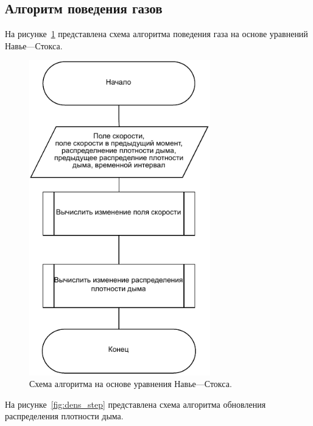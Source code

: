 \subsection{Алгоритм поведения газов}

На рисунке~\ref{fig:Navie-Stocks} представлена схема алгоритма поведения газа на основе уравнений Навье---Стокса. 
\begin{figure}[H]
	\centering
	\includegraphics[width=0.7\textwidth, page=1]{assets/img/Naive_stocks.pdf}   
	\caption{Схема алгоритма на основе уравнения Навье---Стокса.}
	\label{fig:Navie-Stocks}
\end{figure}

На рисунке~\ref{fig:dens_step} представлена схема алгоритма обновления распределения плотности дыма.

